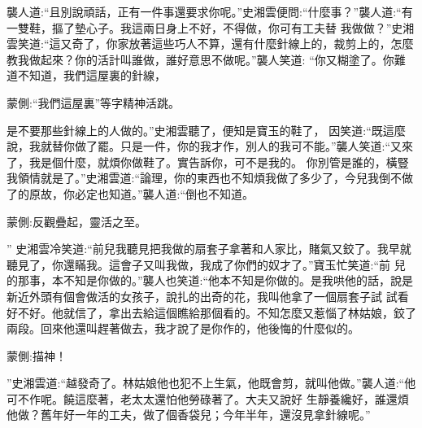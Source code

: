 \begin{parag}
    襲人道:“且別說頑話，正有一件事還要求你呢。”史湘雲便問:“什麼事？”襲人道:“有一雙鞋，摳了墊心子。我這兩日身上不好，不得做，你可有工夫替 我做做？”史湘雲笑道:“這又奇了，你家放著這些巧人不算，還有什麼針線上的，裁剪上的，怎麼教我做起來？你的活計叫誰做，誰好意思不做呢。”襲人笑道: “你又糊塗了。你難道不知道，我們這屋裏的針線，\begin{note}蒙側:“我們這屋裏”等字精神活跳。\end{note}是不要那些針線上的人做的。”史湘雲聽了，便知是寶玉的鞋了， 因笑道:“既這麼說，我就替你做了罷。只是一件，你的我才作，別人的我可不能。”襲人笑道:“又來了，我是個什麼，就煩你做鞋了。實告訴你，可不是我的。 你別管是誰的，橫豎我領情就是了。”史湘雲道:“論理，你的東西也不知煩我做了多少了，今兒我倒不做了的原故，你必定也知道。”襲人道:“倒也不知道。\begin{note}蒙側:反觀疊起，靈活之至。\end{note}” 史湘雲冷笑道:“前兒我聽見把我做的扇套子拿著和人家比，賭氣又鉸了。我早就聽見了，你還瞞我。這會子又叫我做，我成了你們的奴才了。”寶玉忙笑道:“前 兒的那事，本不知是你做的。”襲人也笑道:“他本不知是你做的。是我哄他的話，說是新近外頭有個會做活的女孩子，說扎的出奇的花，我叫他拿了一個扇套子試 試看好不好。他就信了，拿出去給這個瞧給那個看的。不知怎麼又惹惱了林姑娘，鉸了兩段。回來他還叫趕著做去，我才說了是你作的，他後悔的什麼似的。\begin{note}蒙側:描神！\end{note}”史湘雲道:“越發奇了。林姑娘他也犯不上生氣，他既會剪，就叫他做。”襲人道:“他可不作呢。饒這麼著，老太太還怕他勞碌著了。大夫又說好 生靜養纔好，誰還煩他做？舊年好一年的工夫，做了個香袋兒；今年半年，還沒見拿針線呢。”
\end{parag}


